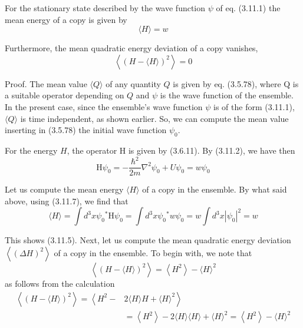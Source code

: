 \documentclass{article}
\begin{document}
For the stationary state described by the wave function $\psi$ of eq. (3.11.1) the mean energy of a copy is given by
$$
\begin{equation*}
\langle H\rangle=w \tag{3.11.5}
\end{equation*}
$$

Furthermore, the mean quadratic energy deviation of a copy vanishes,
$$
\begin{equation*}
\left\langle(H-\langle H\rangle)^{2}\right\rangle=0 \tag{3.11.6}
\end{equation*}
$$

Proof. The mean value $\langle Q\rangle$ of any quantity $Q$ is given by eq. (3.5.78), where Q is a suitable operator depending on $Q$ and $\psi$ is the wave function of the ensemble. In the present case, since the ensemble's wave function $\psi$ is of the form (3.11.1), $\langle Q\rangle$ is time independent, as shown earlier. So, we can compute the mean value inserting in (3.5.78) the initial wave function $\psi_{0}$.

For the energy $H$, the operator H is given by (3.6.11). By (3.11.2), we have then
$$
\begin{equation*}
\mathrm{H} \psi_{0}=-\frac{\hbar^{2}}{2 m} \nabla^{2} \psi_{0}+U \psi_{0}=w \psi_{0} \tag{3.11.7}
\end{equation*}
$$

Let us compute the mean energy $\langle H\rangle$ of a copy in the ensemble. By what said above, using (3.11.7), we find that
$$
\begin{equation*}
\langle H\rangle=\int d^{3} x \psi_{0}{ }^{*} \mathrm{H} \psi_{0}=\int d^{3} x \psi_{0}{ }^{*} w \psi_{0}=w \int d^{3} x\left|\psi_{0}\right|^{2}=w \tag{3.11.8}
\end{equation*}
$$

This shows (3.11.5).
Next, let us compute the mean quadratic energy deviation $\left\langle(\Delta H)^{2}\right\rangle$ of a copy in the ensemble. To begin with, we note that
$$
\begin{equation*}
\left\langle(H-\langle H\rangle)^{2}\right\rangle=\left\langle H^{2}\right\rangle-\langle H\rangle^{2} \tag{3.11.9}
\end{equation*}
$$
as follows from the calculation
$$
\begin{align*}
\left\langle(H-\langle H\rangle)^{2}\right\rangle=\left\langle H^{2}-\right. & \left.2\langle H\rangle H+\langle H\rangle^{2}\right\rangle  \tag{3.11.10}\\
& =\left\langle H^{2}\right\rangle-2\langle H\rangle\langle H\rangle+\langle H\rangle^{2}=\left\langle H^{2}\right\rangle-\langle H\rangle^{2}
\end{align*}
$$
\end{document}
